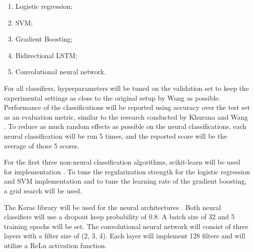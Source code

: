 \begin{enumerate}
    \item Logistic regression;
    \item SVM;
    \item Gradient Boosting;
    \item Bidirectional LSTM;
    \item Convolutional neural network.
\end{enumerate}

For all classifiers, hyperparameters will be tuned on the validation set to keep the experimental settings as close to the original setup by Wang as possible.
Performance of the classifications will be reported using accuracy over the test set as an evaluation metric, similar to the research conducted by Khurana and Wang \cite{wang2018,khurana2017}. 
To reduce as much random effects as possible on the neural classifications, each neural classification will be run 5 times, and the reported score will be the average of those 5 scores. 

For the first three non-neural classification algorithms, scikit-learn will be used for implementation \cite{scikit-learn}. 
To tune the regularization strength for the logistic regression and SVM implementation and to tune the learning rate of the gradient boosting, a grid search will be used. 

The Keras library will be used for the neural architectures \cite{keras}.
Both neural classifiers will use a dropout keep probability of 0.8.
A batch size of 32 and 5 training epochs will be set. 
The convolutional neural network will consist of three layers with a filter size of (2, 3, 4).
Each layer will implement 128 filters and will utilize a ReLu activation function.